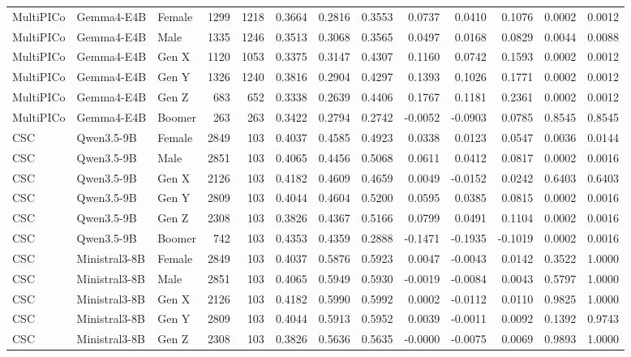 \begin{longtable}{lllrrrrrrrrrr}
MultiPICo & Gemma4-E4B & Female & 1299 & 1218 & 0.3664 & 0.2816 & 0.3553 & 0.0737 & 0.0410 & 0.1076 & 0.0002 & 0.0012 \\
MultiPICo & Gemma4-E4B & Male & 1335 & 1246 & 0.3513 & 0.3068 & 0.3565 & 0.0497 & 0.0168 & 0.0829 & 0.0044 & 0.0088 \\
MultiPICo & Gemma4-E4B & Gen X & 1120 & 1053 & 0.3375 & 0.3147 & 0.4307 & 0.1160 & 0.0742 & 0.1593 & 0.0002 & 0.0012 \\
MultiPICo & Gemma4-E4B & Gen Y & 1326 & 1240 & 0.3816 & 0.2904 & 0.4297 & 0.1393 & 0.1026 & 0.1771 & 0.0002 & 0.0012 \\
MultiPICo & Gemma4-E4B & Gen Z & 683 & 652 & 0.3338 & 0.2639 & 0.4406 & 0.1767 & 0.1181 & 0.2361 & 0.0002 & 0.0012 \\
MultiPICo & Gemma4-E4B & Boomer & 263 & 263 & 0.3422 & 0.2794 & 0.2742 & -0.0052 & -0.0903 & 0.0785 & 0.8545 & 0.8545 \\
CSC & Qwen3.5-9B & Female & 2849 & 103 & 0.4037 & 0.4585 & 0.4923 & 0.0338 & 0.0123 & 0.0547 & 0.0036 & 0.0144 \\
CSC & Qwen3.5-9B & Male & 2851 & 103 & 0.4065 & 0.4456 & 0.5068 & 0.0611 & 0.0412 & 0.0817 & 0.0002 & 0.0016 \\
CSC & Qwen3.5-9B & Gen X & 2126 & 103 & 0.4182 & 0.4609 & 0.4659 & 0.0049 & -0.0152 & 0.0242 & 0.6403 & 0.6403 \\
CSC & Qwen3.5-9B & Gen Y & 2809 & 103 & 0.4044 & 0.4604 & 0.5200 & 0.0595 & 0.0385 & 0.0815 & 0.0002 & 0.0016 \\
CSC & Qwen3.5-9B & Gen Z & 2308 & 103 & 0.3826 & 0.4367 & 0.5166 & 0.0799 & 0.0491 & 0.1104 & 0.0002 & 0.0016 \\
CSC & Qwen3.5-9B & Boomer & 742 & 103 & 0.4353 & 0.4359 & 0.2888 & -0.1471 & -0.1935 & -0.1019 & 0.0002 & 0.0016 \\
CSC & Ministral3-8B & Female & 2849 & 103 & 0.4037 & 0.5876 & 0.5923 & 0.0047 & -0.0043 & 0.0142 & 0.3522 & 1.0000 \\
CSC & Ministral3-8B & Male & 2851 & 103 & 0.4065 & 0.5949 & 0.5930 & -0.0019 & -0.0084 & 0.0043 & 0.5797 & 1.0000 \\
CSC & Ministral3-8B & Gen X & 2126 & 103 & 0.4182 & 0.5990 & 0.5992 & 0.0002 & -0.0112 & 0.0110 & 0.9825 & 1.0000 \\
CSC & Ministral3-8B & Gen Y & 2809 & 103 & 0.4044 & 0.5913 & 0.5952 & 0.0039 & -0.0011 & 0.0092 & 0.1392 & 0.9743 \\
CSC & Ministral3-8B & Gen Z & 2308 & 103 & 0.3826 & 0.5636 & 0.5635 & -0.0000 & -0.0075 & 0.0069 & 0.9893 & 1.0000 \\

\end{longtable}

